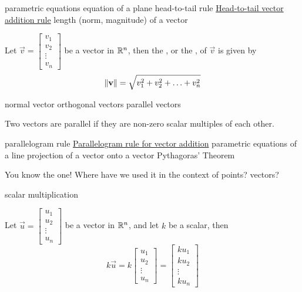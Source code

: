 \documentclass{ximera}
\begin{document}
parametric equations
equation of a plane
head-to-tail rule
\href{https://ximera.osu.edu/oerlinalg/LinearAlgebra/VEC-0030/main}{Head-to-tail vector addition rule}
length (norm, magnitude) of a vector
\begin{expandable}
Let $\vec{v}=\begin{bmatrix}v_1\\ v_2\\ \vdots \\v_n\end{bmatrix}$ be a vector in $\mathbb{R}^n$, then the , or the , of $\vec{v}$ is given by
$$  \left\lVert\mathbf{v}\right\rVert=\sqrt{v_1^2+v_2^2+\ldots +v_n^2}$$
\end{expandable}
normal vector
orthogonal vectors
parallel vectors
\begin{expandable}
    Two vectors are parallel if they are non-zero scalar multiples of each other.
\end{expandable}
parallelogram rule
\href{https://ximera.osu.edu/oerlinalg/LinearAlgebra/VEC-0030/main}{Parallelogram rule for vector addition}
parametric equations of a line
projection of a vector onto a vector
Pythagoras’ Theorem
\begin{expandable}
    You know the one!  Where have we used it in the context of points? 
 vectors?
\end{expandable}
scalar multiplication 
\begin{expandable}
    Let $\vec{u}=\begin{bmatrix}
u_1\\
u_2\\
\vdots\\
u_n
\end{bmatrix}$ be a vector in $\mathbb{R}^n$, and let $k$ be a scalar, then
  $$k\vec{u}=k\begin{bmatrix}
u_1\\
u_2\\
\vdots\\
u_n
\end{bmatrix}=\begin{bmatrix}
ku_1\\
ku_2\\
\vdots\\
ku_n
\end{bmatrix}$$
\end{expandable}
\end{document}
